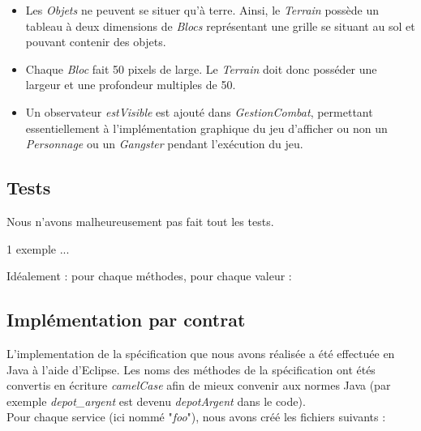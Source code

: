 \documentclass[a4paper, 11pt, notitlepage]{article}
\begin{document}
\begin{itemize}
\item Les \emph{Objets} ne peuvent se situer qu'à terre. Ainsi, le \emph{Terrain} possède un tableau à deux dimensions de \emph{Blocs} représentant une grille se situant au sol et pouvant contenir des objets. \\

\item Chaque \emph{Bloc} fait 50 pixels de large. Le \emph{Terrain} doit donc posséder une largeur et une profondeur multiples de 50. \\

\item Un observateur \emph{estVisible} est ajouté dans \emph{GestionCombat}, permettant essentiellement à l'implémentation graphique du jeu d'afficher ou non un \emph{Personnage} ou un \emph{Gangster} pendant l'exécution du jeu.

\end{itemize}

\subsection{Tests}
Nous n'avons malheureusement pas fait tout les tests.

1 exemple ... 

Idéalement : pour chaque méthodes, pour chaque valeur : 

\subsection{Implémentation par contrat}

L'implementation de la spécification que nous avons réalisée a été effectuée en Java à l'aide d'Eclipse. Les noms des méthodes de la spécification ont étés convertis en écriture \emph{camelCase} afin de mieux convenir aux normes Java (par exemple \emph{depot\_argent} est devenu \emph{depotArgent} dans le code). \\

Pour chaque service (ici nommé "\emph{foo}"), nous avons créé les fichiers suivants :  \\
\end{document}
